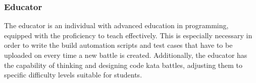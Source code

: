 \subsubsection{Educator}
The educator is an individual with advanced education in programming, equipped with the proficiency to teach effectively. This is especially necessary in order to write the build automation scripts and test cases that have to be uploaded on \app every time a new battle is created. Additionally, the educator has the capability of thinking and designing code kata battles, adjusting them to specific difficulty levels suitable for students.






